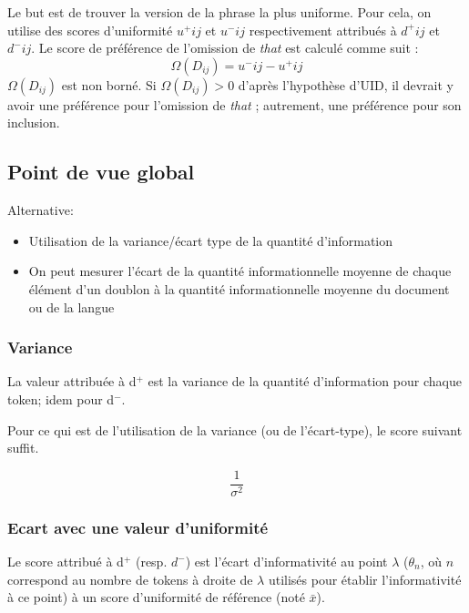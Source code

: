\documentclass{article}
\begin{document}
Le but est de trouver la version de la phrase la plus uniforme. Pour cela, on utilise des scores d'uniformité $u^+{ij}$ et $u^-{ij}$ respectivement attribués à $d^+{ij}$ et $d^-{ij}$. Le score de préférence de l'omission de \textit{that} est calculé comme suit :
\begin{equation}
\Omega(D_{ij}) = u^-{ij} - u^+{ij}
\end{equation}
$\Omega(D_{ij})$ est non borné. Si $\Omega(D_{ij}) > 0$ d'après l'hypothèse d'UID, il devrait y avoir une préférence pour l'omission de \textit{that} ; autrement, une préférence pour son inclusion.

\subsection{Point de vue global}

Alternative:

\begin{itemize}
    \item Utilisation de la variance/écart type de la quantité d'information
    \item On peut mesurer l'écart de la quantité informationnelle moyenne de chaque élément d'un doublon à la quantité informationnelle moyenne du document ou de la langue
\end{itemize}

\subsubsection{Variance}

La valeur attribuée à d$^+$ est la variance de la quantité d'information pour chaque token; idem pour d$^-$. 

Pour ce qui est de l'utilisation de la variance (ou de l'écart-type), le score suivant suffit. 

\begin{equation}
    \frac{1}{\sigma^2}
\end{equation}

\subsubsection{Ecart avec une valeur d'uniformité}

Le score attribué à d$^+$ (resp. $d^-$) est l'écart d'informativité au point $\lambda$ ($\theta_n$, où $n$ correspond au nombre de tokens à droite de $\lambda$ utilisés pour établir l'informativité à ce point) à un score d'uniformité de référence (noté $\bar{x}$). 
\end{document}
